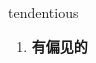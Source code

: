 
\begin{frame}
{\huge tendentious}
\begin{center}
\begin{enumerate}\Large
  \item \textbf{有偏见的}
\end{enumerate}
\end{center}
\end{frame}
